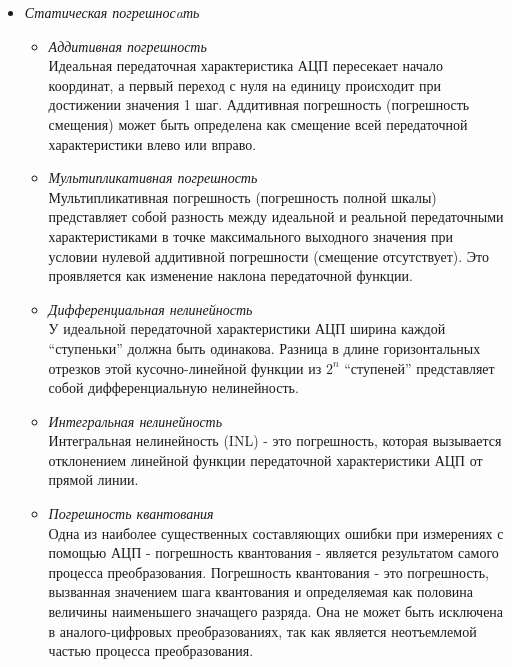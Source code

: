 \begin{itemize}
    \item \textit{Статическая погрешносaть}
        \begin{itemize}
            \item \textit{Аддитивная погрешность} \\
            Идеальная передаточная характеристика АЦП пересекает начало координат, а первый
            переход с нуля на единицу происходит при достижении значения 1 шаг. Аддитивная погрешность
            (погрешность смещения) может быть определена как смещение всей передаточной
            характеристики влево или вправо.
            \item \textit{Мультипликативная погрешность} \\
            Мультипликативная погрешность (погрешность полной шкалы) представляет собой разность
            между идеальной и реальной передаточными характеристиками в точке максимального
            выходного значения при условии нулевой аддитивной погрешности (смещение отсутствует).
            Это проявляется как изменение наклона передаточной функции.
            \item \textit{Дифференциальная нелинейность} \\
            У идеальной передаточной характеристики АЦП ширина каждой ``ступеньки'' должна быть
            одинакова. Разница в длине горизонтальных отрезков этой кусочно-линейной функции из
            $2^{n}$ ``ступеней'' представляет собой дифференциальную нелинейность.
            \item \textit{Интегральная нелинейность} \\
            Интегральная нелинейность (INL) - это погрешность, которая вызывается отклонением
            линейной функции передаточной характеристики АЦП от прямой линии.
            \item \textit{Погрешность квантования} \\
            Одна из наиболее существенных составляющих ошибки при измерениях с помощью АЦП -
            погрешность квантования - является результатом самого процесса преобразования.
            Погрешность квантования - это погрешность, вызванная значением шага квантования
            и определяемая как половина величины наименьшего значащего разряда.
            Она не может быть исключена в аналого-цифровых преобразованиях, так как является
            неотъемлемой частью процесса преобразования.
        \end{itemize}


\end{itemize}
